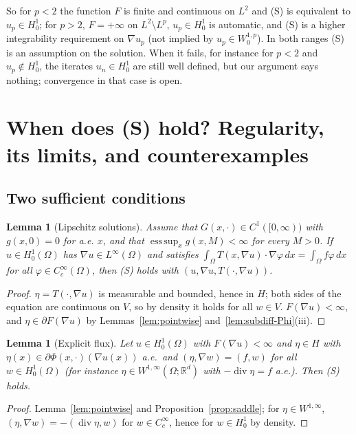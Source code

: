 \documentclass[11pt]{amsart}
\newtheorem{lemma}[theorem]{Lemma}
\theoremstyle{definition}
\theoremstyle{remark}
\numberwithin{equation}{section}
\newcommand{\R}{\mathbb{R}}
\newcommand{\dx}{\,dx}
\DeclareMathOperator{\divg}{div}
\begin{document}
So for $p<2$ the function $F$ is finite and continuous on $L^2$ and (S) is equivalent to $u_p\in H^1_0$; for $p>2$, $F=+\infty$ on $L^2\setminus L^p$, $u_p\in H^1_0$ is automatic, and (S) is a higher integrability requirement on $\nabla u_p$ (not implied by $u_p\in W^{1,p}_0$). In both ranges (S) is an assumption on the solution. When it fails, for instance for $p<2$ and $u_p\notin H^1_0$, the iterates $u_n\in H^1_0$ are still well defined, but our argument says nothing; convergence in that case is open.

\section{When does (S) hold? Regularity, its limits, and counterexamples}\label{sec:S}

\subsection{Two sufficient conditions}
\begin{lemma}[Lipschitz solutions]\label{lem:lipschitz}
Assume that $G(x,\cdot)\in C^1([0,\infty))$ with $g(x,0)=0$ for a.e. $x$, and that $\operatorname*{ess\,sup}_xg(x,M)<\infty$ for every $M>0$. If $u\in H^1_0(\Omega)$ has $\nabla u\in L^\infty(\Omega)$ and satisfies $\int_\Omega T(x,\nabla u)\cdot\nabla\varphi\dx=\int_\Omega f\varphi\dx$ for all $\varphi\in C^\infty_c(\Omega)$, then (S) holds with $(u,\nabla u,T(\cdot,\nabla u))$.
\end{lemma}
\begin{proof}
$\eta=T(\cdot,\nabla u)$ is measurable and bounded, hence in $H$; both sides of the equation are continuous on $V$, so by density it holds for all $w\in V$. $F(\nabla u)<\infty$, and $\eta\in\partial F(\nabla u)$ by Lemmas~\ref{lem:pointwise} and~\ref{lem:subdiff-Phi}(iii).
\end{proof}

\begin{lemma}[Explicit flux]\label{lem:explicit}
Let $u\in H^1_0(\Omega)$ with $F(\nabla u)<\infty$ and $\eta\in H$ with $\eta(x)\in\partial\Phi(x,\cdot)(\nabla u(x))$ a.e.\ and $(\eta,\nabla w)=(f,w)$ for all $w\in H^1_0(\Omega)$ \textup(for instance $\eta\in W^{1,\infty}(\Omega;\R^d)$ with $-\divg\eta=f$ a.e.\textup). Then (S) holds.
\end{lemma}
\begin{proof}
Lemma~\ref{lem:pointwise} and Proposition~\ref{prop:saddle}; for $\eta\in W^{1,\infty}$, $(\eta,\nabla w)=-(\divg\eta,w)$ for $w\in C^\infty_c$, hence for $w\in H^1_0$ by density.
\end{proof}
\end{document}
